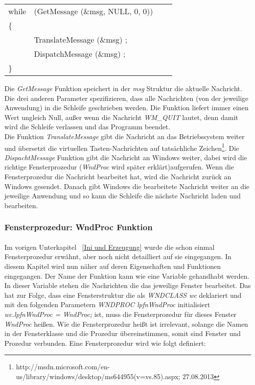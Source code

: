 \begin{tabular}{llll}
while & (GetMessage (\&msg, NULL, 0, 0))\\
\{\\
     & TranslateMessage (\&msg) ;\\
     & DispatchMessage (\&msg) ;\\
\}\\
\end{tabular}

Die \textit{GetMessage} Funktion speichert in der \textit{msg} Struktur die aktuelle Nachricht. Die drei anderen Parameter spezifizieren, dass alle Nachrichten (von der jeweilige Anwendung) in die Schleife geschrieben werden. Die Funktion liefert immer einen Wert ungleich Null, außer wenn die Nachricht \textit{WM\_QUIT} lautet, denn damit wird die Schleife verlassen und das Programm beendet.
\\
Die Funktion \textit{TranslateMessage} gibt die Nachricht an das Betriebssystem weiter und übersetzt die virtuellen Tasten-Nachrichten auf tatsächliche Zeichen\footnote{http://msdn.microsoft.com/en-us/library/windows/desktop/ms644955(v=vs.85).aspx; 27.08.2013}. Die \textit{DispachtMessage} Funktion gibt die Nachricht an Windows weiter, dabei wird die richtige Fensterprozedur (\textit{WndProc} wird später erklärt)aufgerufen. Wenn die Fensterprozedur die Nachricht bearbeitet hat, wird die Nachricht zurück an Windows gesendet.  Danach gibt Windows die bearbeitete Nachricht weiter an die jeweilige Anwendung und so kann die Schleife die nächste Nachricht laden und bearbeiten.



\subsubsection{Fensterprozedur: WndProc Funktion}
\paragraph{}

Im vorigen Unterkapitel ~\ref{Ini und Erzeugung} wurde die schon einmal Fensterprozedur erwähnt, aber noch nicht detailliert auf sie eingegangen. In diesem Kapitel wird nun näher auf deren Eigenschaften und Funktionen eingegangen. Der Name der Funktion kann wie eine Variable gehandhabt werden. In dieser Variable stehen die Nachrichten die das jeweilige Fenster bearbeitet. Das hat zur Folge, dass eine Fensterstruktur die als \textit{WNDCLASS wc} deklariert und mit den folgenden Parametern \textit{WNDPROC lpfnWndProc} initialisiert \textit{wc.lpfnWndProc = WndProc;} ist, muss die Fensterprozedur für dieses Fenster \textit{WndProc} heißen. Wie die Fensterprozedur heißt ist irrelevant, solange die Namen in der Fensterklasse und die Prozedur übereinstimmen, somit sind Fenster und Prozedur verbunden. Eine Fensterprozedur wird wie folgt definiert:

